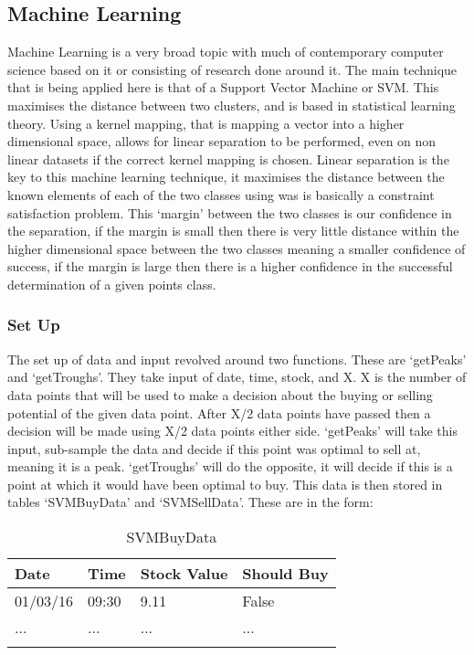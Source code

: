 \documentclass[12pt,a4paper]{article}
\begin{document}
\iffalse
#################################################################################
\fi

\subsection{Machine Learning}

Machine Learning is a very broad topic with much of contemporary computer science based on it or consisting of research done around it. The main technique that is being applied here is that of a Support Vector Machine or SVM. This maximises the distance between two clusters, and is based in statistical learning theory. Using a kernel mapping, that is mapping a vector into a higher dimensional space, allows for linear separation to be performed, even on non linear datasets if the correct kernel mapping is chosen. Linear separation is the key to this machine learning technique, it maximises the distance between the known elements of each of the two classes using was is basically a constraint satisfaction problem. This `margin' between the two classes is our confidence in the separation, if the margin is small then there is very little distance within the higher dimensional space between the two classes meaning a smaller confidence of success, if the margin is large then there is a higher confidence in the successful determination of a given points class. \cite{Wilson2008}

\subsubsection{Set Up}

The set up of data and input revolved around two functions. These are `getPeaks' and `getTroughs'.
They take input of date, time, stock, and X. X is the number of data points that will be used to make a decision about the buying or selling potential of the given data point. After X/2 data points have passed then a decision will be made using X/2 data points either side. `getPeaks' will take this input, sub-sample the data and decide if this point was optimal to sell at, meaning it is a peak. `getTroughs' will do the opposite, it will decide if this is a point at which it would have been optimal to buy. This data is then stored in tables `SVMBuyData' and `SVMSellData'. These are in the form:

\label{units}
\begin{longtable}{ |p{2.25cm}|p{2.25cm}|p{2.25cm}|p{2.25cm}| }\hline\hline
Date & Time & Stock Value & Should Buy \\ \hline
01/03/16 & 09:30 & 9.11 & False  \\ \hline
... & ... & ... & ...  \\ \hline
\caption{SVMBuyData}
\end{longtable}
\end{document}
